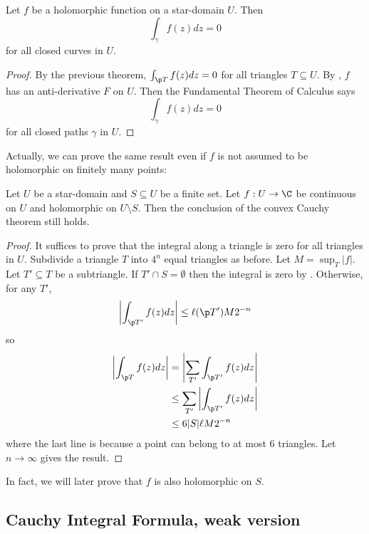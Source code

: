 \documentclass[a4paper]{article}
\begin{document}
\begin{corollary}
  Let \(f\) be a holomorphic function on a star-domain \(U\). Then
  \[
    \int_\gamma f(z)dz = 0
  \]
  for all closed curves in \(U\).
\end{corollary}

\begin{proof}
  By the previous theorem, \(\int_{\p T} f(z)dz = 0\) for all triangles \(T \subseteq U\). By , \(f\) has an anti-derivative \(F\) on \(U\). Then the Fundamental Theorem of Calculus says
  \[
    \int_\gamma f(z)dz = 0
  \]
  for all closed paths \(\gamma\) in \(U\).
\end{proof}

Actually, we can prove the same result even if \(f\) is not assumed to be holomorphic on finitely many points:

\begin{proposition}
  \label{prop:Cauchy with holes}
  Let \(U\) be a star-domain and \(S \subseteq U\) be a finite set. Let \(f: U \to \C\) be continuous on \(U\) and holomorphic on \(U \setminus S\). Then the conclusion of the convex Cauchy theorem still holds.
\end{proposition}

\begin{proof}
  It suffices to prove that the integral along a triangle is zero for all triangles in \(U\). Subdivide a triangle \(T\) into \(4^n\) equal triangles as before. Let \(M = \sup_T |f|\). Let \(T' \subseteq T\) be a subtriangle. If \(T' \cap S = \emptyset\) then the integral is zero by . Otherwise, for any \(T'\),
  \[
    \left| \int_{\p T'} f(z)dz \right| \leq \ell(\p T') M 2^{-n} 
  \]
  so
  \begin{align*}
    \left| \int_{\p T} f(z)dz \right|
    &= \left|\sum_{T'} \int_{\p T'} f(z) dz \right| \\
    &\leq \sum_{T'}\left| \int_{\p T'} f(z)dz \right| \\
    &\leq 6|S|\ell M 2^{-n}
  \end{align*}
  where the last line is because a point can belong to at most \(6\) triangles. Let \(n \to \infty\) gives the result.
\end{proof}

In fact, we will later prove that \(f\) is also holomorphic on \(S\).

\subsection{Cauchy Integral Formula, weak version}
\end{document}
